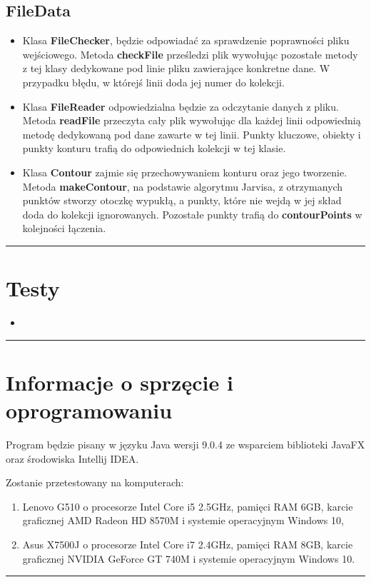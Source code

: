 \documentclass[a4paper,11pt]{article}
\newcommand{\linia}{\rule{\linewidth}{0.4mm}}
\begin{document}
\subsection{FileData}
\begin{itemize}
\item Klasa \textbf{FileChecker}, będzie odpowiadać za sprawdzenie poprawności pliku wejściowego. Metoda \textbf{checkFile} prześledzi plik wywołując pozostałe metody z tej klasy dedykowane pod linie pliku zawierające konkretne dane. W przypadku błędu, w którejś linii doda jej numer do kolekcji.
\item Klasa \textbf{FileReader} odpowiedzialna będzie za odczytanie danych z pliku. Metoda \textbf{readFile} przeczyta cały plik wywołując dla każdej linii odpowiednią metodę dedykowaną pod dane zawarte w tej linii. Punkty kluczowe, obiekty i punkty konturu trafią do odpowiednich kolekcji w tej klasie.
\item Klasa \textbf{Contour} zajmie się przechowywaniem konturu oraz jego tworzenie. Metoda \textbf{makeContour}, na podstawie algorytmu Jarvisa, z otrzymanych punktów stworzy otoczkę wypukłą, a punkty, które nie wejdą w jej skład doda do kolekcji ignorowanych. Pozostałe punkty trafią do \textbf{contourPoints} w kolejności łączenia.
\end{itemize}
\noindent\linia

\section{Testy}
\begin{itemize}
\item 
\end{itemize}

\noindent\linia
\section{Informacje o sprzęcie i oprogramowaniu}
Program będzie pisany w języku Java wersji 9.0.4 ze wsparciem biblioteki JavaFX oraz środowiska Intellij IDEA.

Zostanie przetestowany na komputerach:
\begin{enumerate}
\item Lenovo G510 o procesorze Intel Core i5 2.5GHz, pamięci RAM 6GB, karcie graficznej AMD Radeon
HD 8570M i systemie operacyjnym Windows 10,
\item Asus X7500J o procesorze Intel Core i7 2.4GHz, pamięci RAM 8GB, karcie graficznej NVIDIA GeForce GT 740M i systemie operacyjnym Windows 10. 
\end{enumerate} 
\noindent\linia
\end{document}
